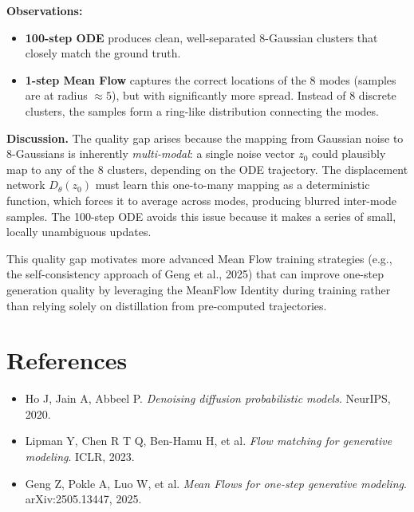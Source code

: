 \documentclass[11pt,a4paper]{article}
\begin{document}
\textbf{Observations:}
\begin{itemize}[nosep]
    \item \textbf{100-step ODE} produces clean, well-separated 8-Gaussian clusters that closely match the ground truth.
    \item \textbf{1-step Mean Flow} captures the correct locations of the 8 modes (samples are at radius $\approx 5$), but with significantly more spread. Instead of 8 discrete clusters, the samples form a ring-like distribution connecting the modes.
\end{itemize}

\textbf{Discussion.} The quality gap arises because the mapping from Gaussian noise to 8-Gaussians is inherently \emph{multi-modal}: a single noise vector $z_0$ could plausibly map to any of the 8 clusters, depending on the ODE trajectory. The displacement network $D_\theta(z_0)$ must learn this one-to-many mapping as a deterministic function, which forces it to average across modes, producing blurred inter-mode samples. The 100-step ODE avoids this issue because it makes a series of small, locally unambiguous updates.

This quality gap motivates more advanced Mean Flow training strategies (e.g., the self-consistency approach of Geng et al., 2025) that can improve one-step generation quality by leveraging the MeanFlow Identity during training rather than relying solely on distillation from pre-computed trajectories.


\section*{References}
\begin{itemize}[nosep]
    \item Ho J, Jain A, Abbeel P. \textit{Denoising diffusion probabilistic models}. NeurIPS, 2020.
    \item Lipman Y, Chen R T Q, Ben-Hamu H, et al. \textit{Flow matching for generative modeling}. ICLR, 2023.
    \item Geng Z, Pokle A, Luo W, et al. \textit{Mean Flows for one-step generative modeling}. arXiv:2505.13447, 2025.
\end{itemize}
\end{document}
